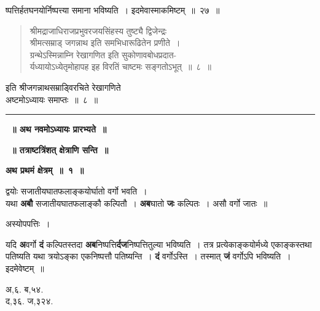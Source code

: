 \documentclass[11pt, openany]{book}
\begin{document}
\noindent ष्पत्तिर्हतघनयोर्निष्पत्त्या समाना भविष्यति~। इदमेवास्माकमिष्टम्~॥~२७~॥ 
\vspace{2mm}

\begin{quote}
\qt
श्रीमद्राजाधिराजप्रभुवरजयसिंहस्य तुष्ट्यै द्विजेन्द्रः \\
श्रीमत्सम्राड् जगन्नाथ इति समभिधारूढितेन प्रणीते~। \\
ग्रन्थेऽस्मिन्नाम्नि रेखागणित इति सुकोणावबोधप्रदात- \\
र्यध्यायोऽध्येतृमोहापह इह विरतिं चाष्टमः सङ्गतोऽभूत्~॥~८~॥ 
\end{quote}
\vspace{-1mm}

\begin{center}
इति श्रीजगन्नाथसम्राड्विरचिते रेखागणिते \\
 अष्टमोऽध्यायः समाप्तः~॥~८~॥ \\
\vspace{6mm} 

\rule{0.9in}{0.8pt}
 \end{center}

\afterpage{\fancyhead[LE,RO]{\thepage}}
\cfoot{}

\newpage
\newpage
\thispagestyle{empty}
 \label{ch9}
\begin{center}
{\bf \LARGE~॥ अथ नवमोऽध्यायः प्रारभ्यते~॥}
\vspace{5mm}

\textbf{~॥ तत्राष्टत्रिंशत् क्षेत्राणि सन्ति~॥  }
\vspace{5mm}

\textbf{\large अथ प्रथमं क्षेत्रम्~॥~१~॥}
\end{center}

{\ab द्वयोः सजातीयघातफलाङ्कयोर्घातो वर्गो भवति~।}\\

यथा \textbf{अबौ} सजातीयघातफलाङ्कौ कल्पितौ~। \textbf{अब}घातो \textbf{जः} कल्पितः~। असौ वर्गो जातः~॥ 

\begin{center}
अस्योपपत्तिः~।
\end{center}

\begin{flushleft}
\begin{minipage}[t]{0.7\textwidth}
\hspace{4mm} यदि \textbf{अ}वर्गो \textbf{दं} कल्पितस्तदा \textbf{अब}निष्पत्ति\textbf{र्दज}निष्पत्तितुल्या भविष्यति~। तत्र प्रत्येकाङ्कयोर्मध्ये एकाङ्कस्तथा पतिष्यति यथा त्रयोऽङ्का एकनिष्पत्तौ पतिष्यन्ति~। \textbf{दं} वर्गोऽस्ति~। तस्मात् \textbf{जं} वर्गोऽपि भविष्यति~। इदमेवेष्टम्~॥
\end{minipage} 
\hfill
\begin{minipage}[t]{0.2\textwidth}
अ,६. ब,५४.\\ 
द,३६. ज,३२४.
\end{minipage}
\end{flushleft}
\vspace{-1mm}
\end{document}
